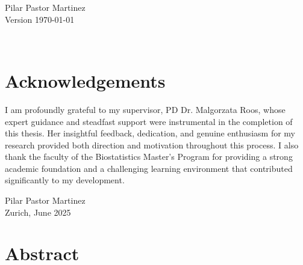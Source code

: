 \documentclass[11pt,a4paper,twoside]{book}
\begin{document}


\graphicspath{{./figure/}}
\setcounter{tocdepth}{1}

\thispagestyle{empty}
\begin{center}
  \vspace*{6cm}{\bfseries\Huge
  Frequentists and Bayesian methods to incorporate 
	recruitment rate stochasticity 
	at the design stage of a clinical trial
  }
  \vfill
  \rm

  \LARGE
  Pilar Pastor Martinez \\[12mm]
  
  \normalsize
  Version \today
\end{center}
\newpage
\thispagestyle{empty}~
\newpage
{}

\thispagestyle{plain}
\tableofcontents
{}

\chapter*{Acknowledgements}
\thispagestyle{plain}

I am profoundly grateful to my supervisor, PD Dr. Malgorzata Roos, whose expert guidance and steadfast support were instrumental in the completion of this thesis. Her insightful feedback, dedication, and genuine enthusiasm for my research provided both direction and motivation throughout this process. I also thank the faculty of the Biostatistics Master's Program for providing a strong academic foundation and a challenging learning environment that contributed significantly to my development.

\bigskip

\begin{flushright}
  Pilar Pastor Martinez\\
  Zurich, June 2025
\end{flushright}


\cleardoublepage
{}

\chapter*{Abstract}
\thispagestyle{plain}
\end{document}

